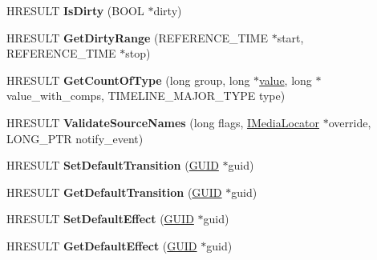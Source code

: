 \begin{DoxyCompactItemize}
\mbox{\label{interface_i_a_m_timeline_aaa49fcfb2c1fded79e1d5514c86d615b}} 
H\+R\+E\+S\+U\+LT {\bfseries Is\+Dirty} (B\+O\+OL $\ast$dirty)
\item 
\mbox{\label{interface_i_a_m_timeline_aa4cdc7fbeed7820c0c866bcfb211148b}} 
H\+R\+E\+S\+U\+LT {\bfseries Get\+Dirty\+Range} (R\+E\+F\+E\+R\+E\+N\+C\+E\+\_\+\+T\+I\+ME $\ast$start, R\+E\+F\+E\+R\+E\+N\+C\+E\+\_\+\+T\+I\+ME $\ast$stop)
\item 
\mbox{\label{interface_i_a_m_timeline_a67a20b67879ea1fb28febbca3a6abfe4}} 
H\+R\+E\+S\+U\+LT {\bfseries Get\+Count\+Of\+Type} (long group, long $\ast$\hyperlink{unionvalue}{value}, long $\ast$value\+\_\+with\+\_\+comps, T\+I\+M\+E\+L\+I\+N\+E\+\_\+\+M\+A\+J\+O\+R\+\_\+\+T\+Y\+PE type)
\item 
\mbox{\label{interface_i_a_m_timeline_a31c85aaf156887af28e5cd53b55b00c8}} 
H\+R\+E\+S\+U\+LT {\bfseries Validate\+Source\+Names} (long flags, \hyperlink{interface_i_media_locator}{I\+Media\+Locator} $\ast$override, L\+O\+N\+G\+\_\+\+P\+TR notify\+\_\+event)
\item 
\mbox{\label{interface_i_a_m_timeline_afd3908c69b962a1db6941860710d35e5}} 
H\+R\+E\+S\+U\+LT {\bfseries Set\+Default\+Transition} (\hyperlink{interface_g_u_i_d}{G\+U\+ID} $\ast$guid)
\item 
\mbox{\label{interface_i_a_m_timeline_aacaf8bf89ddc920f6f1f4f987f37bf29}} 
H\+R\+E\+S\+U\+LT {\bfseries Get\+Default\+Transition} (\hyperlink{interface_g_u_i_d}{G\+U\+ID} $\ast$guid)
\item 
\mbox{\label{interface_i_a_m_timeline_a019fcb9bc480a6c64a0e466210975084}} 
H\+R\+E\+S\+U\+LT {\bfseries Set\+Default\+Effect} (\hyperlink{interface_g_u_i_d}{G\+U\+ID} $\ast$guid)
\item 
\mbox{\label{interface_i_a_m_timeline_a2739c8889535326510dba66a87d809ea}} 
H\+R\+E\+S\+U\+LT {\bfseries Get\+Default\+Effect} (\hyperlink{interface_g_u_i_d}{G\+U\+ID} $\ast$guid)
\item 
\mbox{\label{interface_i_a_m_timeline_aa9fc755a23aae2d2490b2da0e5540854}} 

\end{DoxyCompactItemize}
